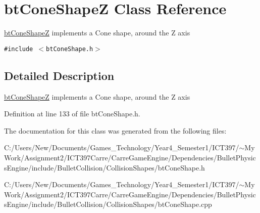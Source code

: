 \hypertarget{classbt_cone_shape_z}{
\section{btConeShapeZ Class Reference}
\label{classbt_cone_shape_z}
}
\hyperlink{classbt_cone_shape_z}{btConeShapeZ} implements a Cone shape, around the Z axis  


{\tt \#include $<$btConeShape.h$>$}



\subsection{Detailed Description}
\hyperlink{classbt_cone_shape_z}{btConeShapeZ} implements a Cone shape, around the Z axis 

Definition at line 133 of file btConeShape.h.

The documentation for this class was generated from the following files:\begin{CompactItemize}
\item 
C:/Users/New/Documents/Games\_\-Technology/Year4\_\-Semester1/ICT397/$\sim$My Work/Assignment2/ICT397Carre/CarreGameEngine/Dependencies/BulletPhysicsEngine/include/BulletCollision/CollisionShapes/btConeShape.h\item 
C:/Users/New/Documents/Games\_\-Technology/Year4\_\-Semester1/ICT397/$\sim$My Work/Assignment2/ICT397Carre/CarreGameEngine/Dependencies/BulletPhysicsEngine/include/BulletCollision/CollisionShapes/btConeShape.cpp\end{CompactItemize}
